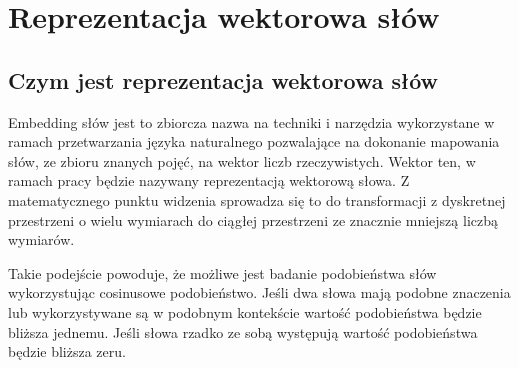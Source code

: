 \newpage %
\section{\label{embeddings}Reprezentacja wektorowa słów}

\subsection{Czym jest reprezentacja wektorowa słów}





Embedding słów jest to zbiorcza nazwa na techniki i narzędzia wykorzystane w ramach przetwarzania języka naturalnego pozwalające na dokonanie mapowania słów, ze zbioru znanych pojęć, na wektor liczb rzeczywistych. Wektor ten, w ramach pracy będzie nazywany reprezentacją wektorową słowa. Z matematycznego punktu widzenia sprowadza się to do transformacji z dyskretnej przestrzeni o wielu wymiarach do ciągłej przestrzeni ze znacznie mniejszą liczbą wymiarów. \cite{Emb_def}



Takie podejście powoduje, że możliwe jest badanie podobieństwa słów wykorzystując cosinusowe podobieństwo. Jeśli dwa słowa mają podobne znaczenia lub wykorzystywane są w podobnym kontekście  wartość podobieństwa będzie bliższa jednemu. Jeśli słowa rzadko ze sobą występują wartość podobieństwa będzie bliższa zeru.  \cite{Cooos_def}





